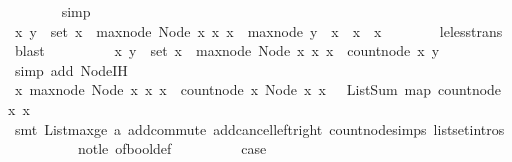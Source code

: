 \begin{isabellebody}
\ \ \ \ \ \ \isamarkupfalse%
\ simp\isanewline
\ \ \ \ \isamarkupfalse%
\ \isamarkupfalse%
\ {\isachardoublequoteopen}{\isasymforall}x{\isachardot}\ {\isasymforall}y\ {\isasymin}\ set\ x{}\ {\isachardot}\ max{\isacharunderscore}node\ {\isacharparenleft}Node\ x{}\ x{}{\isacharparenright}{\isacharless}\ x\ {\isasymlongrightarrow}\ max{\isacharunderscore}node\ y\ {\isacharless}\ x\ {\isasymand}\ x{}\ {\isacharless}\ x{\isachardoublequoteclose}\isanewline
\ \ \ \ \ \ \isamarkupfalse%
\ le{\isacharunderscore}less{\isacharunderscore}trans\ \isamarkupfalse%
\ blast\ \ \isanewline
\ \ \ \ \isamarkupfalse%
\ \isamarkupfalse%
\ {\isachardoublequoteopen}{\isasymforall}x{\isachardot}\ {\isasymforall}y\ {\isasymin}\ set\ x{}\ {\isachardot}\ max{\isacharunderscore}node\ {\isacharparenleft}Node\ x{}\ x{}{\isacharparenright}{\isacharless}\ x\ {\isasymlongrightarrow}\ count{\isacharunderscore}node\ x\ y\ {\isacharequal}\ {}{\isachardoublequoteclose}\isanewline
\ \ \ \ \ \ \isamarkupfalse%
\ {\isacharparenleft}simp\ add{\isacharcolon}\ Node{\isachardot}IH{\isacharparenright}\isanewline
\ \ \ \ \isamarkupfalse%
\ \isamarkupfalse%
\ {\isachardoublequoteopen}{\isasymforall}x{\isachardot}\ max{\isacharunderscore}node\ {\isacharparenleft}Node\ x{}\ x{}{\isacharparenright}{\isacharless}\ x\ {\isasymlongrightarrow}\ count{\isacharunderscore}node\ x\ {\isacharparenleft}Node\ x{}\ x{}{\isacharparenright}\ {\isacharequal}\ \ ListSum\ {\isacharparenleft}map\ {\isacharparenleft}count{\isacharunderscore}node\ x{\isacharparenright}\ x{}{\isacharparenright}{\isachardoublequoteclose}\isanewline
\ \ \ \ \ \ \isamarkupfalse%
\ {\isacharparenleft}smt\ Listmax{\isacharunderscore}ge\ a\ add{\isachardot}commute\ add{\isacharunderscore}cancel{\isacharunderscore}left{\isacharunderscore}right\ count{\isacharunderscore}node{\isachardot}simps{\isacharparenleft}{}{\isacharparenright}\ list{\isachardot}set{\isacharunderscore}intros{\isacharparenleft}{}{\isacharparenright}\ \isanewline
\ \ \ \ \ \ \ \ \ \ not{\isacharunderscore}le\ of{\isacharunderscore}bool{\isacharunderscore}def{\isacharparenright}\isanewline
\ \ \ \ \ \ \isamarkupfalse%
\ \isamarkupfalse%
\ {\isacharquery}case\isanewline
\ \ \ \ \ \ \isamarkupfalse%

\end{isabellebody}
